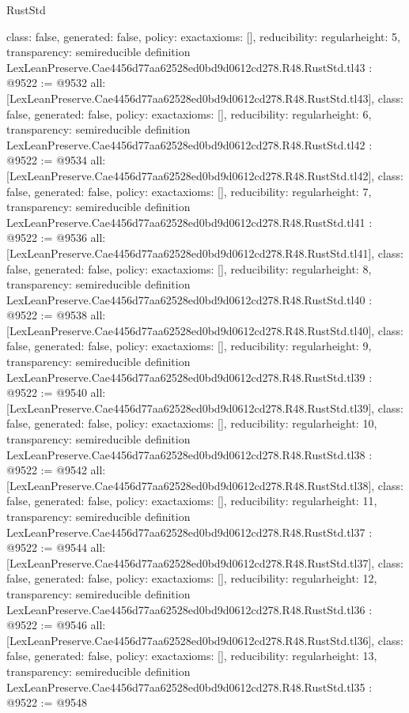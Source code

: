 \begin{lexlean}{RustStd}
\begin{coremodule}
{  class: false,
  generated: false,
  policy: exact{axioms: []},
  reducibility: regular{height: 5},
  transparency: semireducible
}
definition LexLeanPreserve.Cae4456d77aa62528ed0bd9d0612cd278.R48.RustStd.tl43 : @9522 := @9532 {
  all: [LexLeanPreserve.Cae4456d77aa62528ed0bd9d0612cd278.R48.RustStd.tl43],
  class: false,
  generated: false,
  policy: exact{axioms: []},
  reducibility: regular{height: 6},
  transparency: semireducible
}
definition LexLeanPreserve.Cae4456d77aa62528ed0bd9d0612cd278.R48.RustStd.tl42 : @9522 := @9534 {
  all: [LexLeanPreserve.Cae4456d77aa62528ed0bd9d0612cd278.R48.RustStd.tl42],
  class: false,
  generated: false,
  policy: exact{axioms: []},
  reducibility: regular{height: 7},
  transparency: semireducible
}
definition LexLeanPreserve.Cae4456d77aa62528ed0bd9d0612cd278.R48.RustStd.tl41 : @9522 := @9536 {
  all: [LexLeanPreserve.Cae4456d77aa62528ed0bd9d0612cd278.R48.RustStd.tl41],
  class: false,
  generated: false,
  policy: exact{axioms: []},
  reducibility: regular{height: 8},
  transparency: semireducible
}
definition LexLeanPreserve.Cae4456d77aa62528ed0bd9d0612cd278.R48.RustStd.tl40 : @9522 := @9538 {
  all: [LexLeanPreserve.Cae4456d77aa62528ed0bd9d0612cd278.R48.RustStd.tl40],
  class: false,
  generated: false,
  policy: exact{axioms: []},
  reducibility: regular{height: 9},
  transparency: semireducible
}
definition LexLeanPreserve.Cae4456d77aa62528ed0bd9d0612cd278.R48.RustStd.tl39 : @9522 := @9540 {
  all: [LexLeanPreserve.Cae4456d77aa62528ed0bd9d0612cd278.R48.RustStd.tl39],
  class: false,
  generated: false,
  policy: exact{axioms: []},
  reducibility: regular{height: 10},
  transparency: semireducible
}
definition LexLeanPreserve.Cae4456d77aa62528ed0bd9d0612cd278.R48.RustStd.tl38 : @9522 := @9542 {
  all: [LexLeanPreserve.Cae4456d77aa62528ed0bd9d0612cd278.R48.RustStd.tl38],
  class: false,
  generated: false,
  policy: exact{axioms: []},
  reducibility: regular{height: 11},
  transparency: semireducible
}
definition LexLeanPreserve.Cae4456d77aa62528ed0bd9d0612cd278.R48.RustStd.tl37 : @9522 := @9544 {
  all: [LexLeanPreserve.Cae4456d77aa62528ed0bd9d0612cd278.R48.RustStd.tl37],
  class: false,
  generated: false,
  policy: exact{axioms: []},
  reducibility: regular{height: 12},
  transparency: semireducible
}
definition LexLeanPreserve.Cae4456d77aa62528ed0bd9d0612cd278.R48.RustStd.tl36 : @9522 := @9546 {
  all: [LexLeanPreserve.Cae4456d77aa62528ed0bd9d0612cd278.R48.RustStd.tl36],
  class: false,
  generated: false,
  policy: exact{axioms: []},
  reducibility: regular{height: 13},
  transparency: semireducible
}
definition LexLeanPreserve.Cae4456d77aa62528ed0bd9d0612cd278.R48.RustStd.tl35 : @9522 := @9548 {
}
\end{coremodule}
\end{lexlean}
